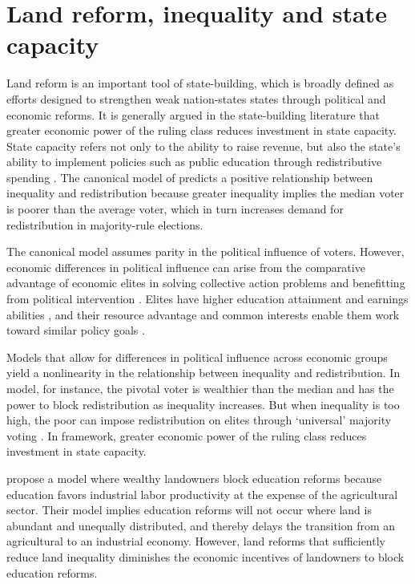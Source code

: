 \section{Land reform, inequality and state capacity}

Land reform is an important tool of state-building, which is broadly defined as efforts designed to strengthen weak nation-states states through political and economic reforms. It is generally argued in the state-building literature that greater economic power of the ruling class reduces investment in state capacity. State capacity refers not only to the ability to raise revenue, but also the state’s ability to implement policies such as public education through redistributive spending \citep{besley2010state}. The canonical model of \citet{meltzer1981rational} predicts a positive relationship between inequality and redistribution because greater inequality implies the median voter is poorer than the average voter, which in turn increases demand for redistribution in majority-rule elections. 

The canonical model assumes parity in the political influence of voters. However, economic differences in political influence can arise from the comparative advantage of economic elites in solving collective action problems and benefitting from political intervention \citep{acemoglu2008persistence}. Elites have higher education attainment and earnings abilities \citep{bourguignon2000oligarchy}, and their resource advantage and common interests enable them work toward similar policy goals \citep{winters2009}. 

Models that allow for differences in political influence across economic groups yield a nonlinearity in the relationship between inequality and redistribution. In  model, for instance, the pivotal voter is wealthier than the median and has the power to block redistribution as inequality increases. But when inequality is too high, the poor can impose redistribution on elites through `universal' majority voting \citep{perotti1993political,saint1993education}. In  framework, greater economic power of the ruling class reduces investment in state capacity. 

\citet{galor2009inequality} propose a model where wealthy landowners block education reforms because education favors industrial labor productivity at the expense of the agricultural sector. Their model implies education reforms will not occur where land is abundant and unequally distributed, and thereby delays the transition from an agricultural to an industrial economy. However, land reforms that sufficiently reduce land inequality diminishes the economic incentives of landowners to block education reforms. 

